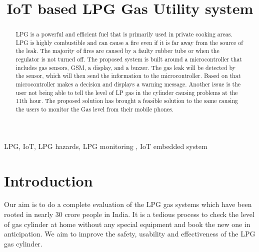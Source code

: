 \documentclass[conference]{IEEEtran}
\begin{document}
\title{IoT based LPG Gas Utility system}

\author{
}


\maketitle

\begin{abstract}
  LPG is a powerful and efficient fuel that is primarily
  used in private cooking areas. LPG is highly combustible
  and can cause a fire even if it is far away from the
  source of the leak. The majority of fires are caused by
  a faulty rubber tube or when the regulator is not turned
  off. The proposed system is built around a microcontroller
  that includes gas sensors, GSM, a display, and a buzzer.
  The gas leak will be detected by the sensor, which will
  then send the information to the microcontroller. Based
  on that microcontroller makes a decision and displays a
  warning message. Another issue is the user not being
  able to tell the level of LP gas in the cylinder causing
  problems at the 11th hour. The proposed solution has
  brought a feasible solution to the same causing the
  users to monitor the Gas level from their mobile phones.
\end{abstract}

\begin{IEEEkeywords}
  LPG, IoT, LPG hazards, LPG monitoring , IoT embedded system
\end{IEEEkeywords}

\section{Introduction}
Our aim is to do a complete evaluation of the LPG
gas systems which have been rooted in nearly 30
crore people in India.\cite{[8]} It is a tedious process to
check the level of gas cylinder at home without any
special equipment and book the new one in anticipation.
We aim to improve the safety, usability and effectiveness
of the LPG gas cylinder.\\
\end{document}
